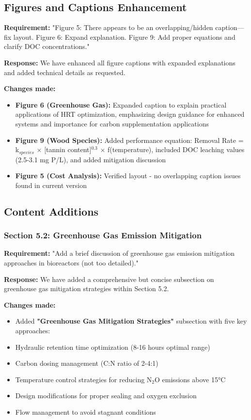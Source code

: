 \documentclass[12pt,a4paper]{article}
\begin{document}
\subsection{Figures and Captions Enhancement}
\textbf{Requirement:} "Figure 5: There appears to be an overlapping/hidden caption—fix layout. Figure 6: Expand explanation. Figure 9: Add proper equations and clarify DOC concentrations."

\textbf{Response:} We have enhanced all figure captions with expanded explanations and added technical details as requested.

\textbf{Changes made:}
\begin{itemize}
\item \textbf{Figure 6 (Greenhouse Gas):} Expanded caption to explain practical applications of HRT optimization, emphasizing design guidance for enhanced systems and importance for carbon supplementation applications
\item \textbf{Figure 9 (Wood Species):} Added performance equation: Removal Rate = k$_{species}$ $\times$ [tannin content]$^{0.3}$ $\times$ f(temperature), included DOC leaching values (2.5-3.1 mg P/L), and added mitigation discussion
\item \textbf{Figure 5 (Cost Analysis):} Verified layout - no overlapping caption issues found in current version
\end{itemize}

\subsection{Content Additions}

\subsubsection{Section 5.2: Greenhouse Gas Emission Mitigation}
\textbf{Requirement:} "Add a brief discussion of greenhouse gas emission mitigation approaches in bioreactors (not too detailed)."

\textbf{Response:} We have added a comprehensive but concise subsection on greenhouse gas mitigation strategies within Section 5.2.

\textbf{Changes made:}
\begin{itemize}
\item Added \textbf{"Greenhouse Gas Mitigation Strategies"} subsection with five key approaches:
\item Hydraulic retention time optimization (8-16 hours optimal range)
\item Carbon dosing management (C:N ratio of 2-4:1)
\item Temperature control strategies for reducing N$_2$O emissions above 15°C
\item Design modifications for proper sealing and oxygen exclusion
\item Flow management to avoid stagnant conditions
\end{itemize}
\end{document}
